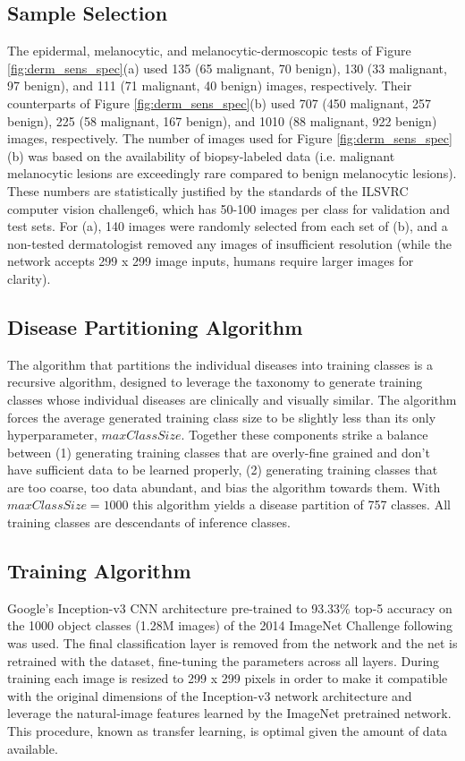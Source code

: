 \subsection{Sample Selection}
The epidermal, melanocytic, and melanocytic-dermoscopic tests of Figure \ref{fig:derm_sens_spec}(a) used 135 (65 malignant, 70 benign), 130 (33 malignant, 97 benign), and 111 (71 malignant, 40 benign) images, respectively. Their counterparts of Figure \ref{fig:derm_sens_spec}(b) used 707 (450 malignant, 257 benign), 225 (58 malignant, 167 benign), and 1010 (88 malignant, 922 benign) images, respectively. The number of images used for Figure \ref{fig:derm_sens_spec}(b) was based on the availability of biopsy-labeled data (i.e. malignant melanocytic lesions are exceedingly rare compared to benign melanocytic lesions). These numbers are statistically justified by the standards of the ILSVRC computer vision challenge6, which has 50-100 images per class for validation and test sets. For (a), 140 images were randomly selected from each set of (b), and a non-tested dermatologist removed any images of insufficient resolution (while the network accepts 299 x 299 image inputs, humans require larger images for clarity).

\subsection{Disease Partitioning Algorithm}
The algorithm that partitions the individual diseases into training classes is a recursive algorithm, designed to leverage the taxonomy to generate training classes whose individual diseases are clinically and visually similar. The algorithm forces the average generated training class size to be slightly less than its only hyperparameter, $maxClassSize$. Together these components strike a balance between (1) generating training classes that are overly-fine grained and don’t have sufficient data to be learned properly, (2) generating training classes that are too coarse, too data abundant, and bias the algorithm towards them. With $maxClassSize = 1000$ this algorithm yields a disease partition of 757 classes. All training classes are descendants of inference classes.

\subsection{Training Algorithm}
Google’s Inception-v3 CNN architecture pre-trained to 93.33\% top-5 accuracy on the 1000 object classes (1.28M images) of the 2014 ImageNet Challenge following \cite{szegedy2016rethinking} was used. The final classification layer is removed from the network and the net is retrained with the dataset, fine-tuning the parameters across all layers. During training each image is resized to 299 x 299 pixels in order to make it compatible with the original dimensions of the Inception-v3 network architecture and leverage the natural-image features learned by the ImageNet pretrained network. This procedure, known as transfer learning, is optimal given the amount of data available.

